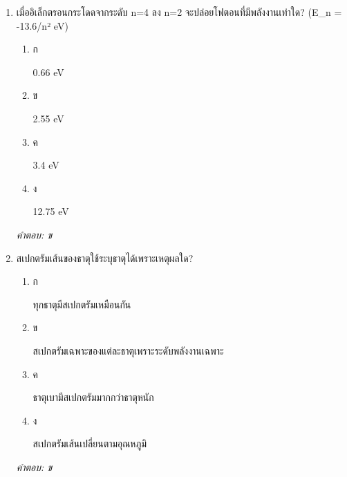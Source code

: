 \documentclass[12pt]{article}
\begin{document}
\begin{enumerate}[label=\arabic*., itemsep=0.5\baselineskip, topsep=0.5\baselineskip, leftmargin=*]
\item เมื่ออิเล็กตรอนกระโดดจากระดับ n=4 ลง n=2 จะปล่อยโฟตอนที่มีพลังงานเท่าใด? (E\_n = -13.6/n² eV)
\begin{enumerate}[label=\alph*)., itemsep=0.3\baselineskip, topsep=0.3\baselineskip]
\item ก\ 
\begin{minipage}[t]{0.9\linewidth}
\raggedright 0.66 eV
\end{minipage}
\item ข\ 
\begin{minipage}[t]{0.9\linewidth}
\raggedright 2.55 eV
\end{minipage}
\item ค\ 
\begin{minipage}[t]{0.9\linewidth}
\raggedright 3.4 eV
\end{minipage}
\item ง\ 
\begin{minipage}[t]{0.9\linewidth}
\raggedright 12.75 eV
\end{minipage}
\end{enumerate}
\vspace{-0.3\baselineskip}
\begin{small}
\textit{คำตอบ: ข}
\end{small}

\item สเปกตรัมเส้นของธาตุใช้ระบุธาตุได้เพราะเหตุผลใด?
\begin{enumerate}[label=\alph*)., itemsep=0.3\baselineskip, topsep=0.3\baselineskip]
\item ก\ 
\begin{minipage}[t]{0.9\linewidth}
\raggedright ทุกธาตุมีสเปกตรัมเหมือนกัน
\end{minipage}
\item ข\ 
\begin{minipage}[t]{0.9\linewidth}
\raggedright สเปกตรัมเฉพาะของแต่ละธาตุเพราะระดับพลังงานเฉพาะ
\end{minipage}
\item ค\ 
\begin{minipage}[t]{0.9\linewidth}
\raggedright ธาตุเบามีสเปกตรัมมากกว่าธาตุหนัก
\end{minipage}
\item ง\ 
\begin{minipage}[t]{0.9\linewidth}
\raggedright สเปกตรัมเส้นเปลี่ยนตามอุณหภูมิ
\end{minipage}
\end{enumerate}
\vspace{-0.3\baselineskip}
\begin{small}
\textit{คำตอบ: ข}
\end{small}


\end{enumerate}
\end{document}
